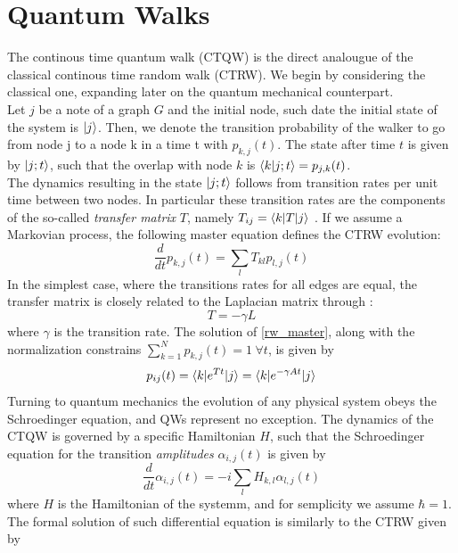 \section{Quantum Walks}
The continous time quantum walk (CTQW) is the direct analougue of the classical continous time random walk (CTRW). We begin by considering the classical one, expanding later on the quantum mechanical counterpart. \nocite{Mulken2011} \\
Let $j$ be a note of a graph $G$ and the initial node, such date the initial state of the system is ${|{j}\rangle}$. Then, we denote the transition probability of the walker to go from node j to a node k in a time t with $p_{k,j}(t)$. The state after time $t$ is given by ${|{j;t}\rangle}$, such that the overlap with node $k$ is $\braket{k|j;t}=p_{j,k}(t)$. \\
The dynamics resulting in the state ${|{j;t}\rangle}$ follows from transition rates per unit time between two nodes. In particular these transition rates are the components of the so-called \textit{transfer matrix} $T$, namely $T_{ij}= {\langle{k}|}T{|{j}\rangle}$ . If we assume a Markovian process, the following master equation defines the CTRW evolution:
\begin{equation}
  \frac{d}{dt}p_{k,j}(t) = \sum_{l}T_{kl}p_{l,j}(t)
  \label{rw_master}
\end{equation}
In the simplest case, where the transitions rates for all edges are equal, the transfer matrix is closely related to the Laplacian matrix through :
\begin{equation}
  T = -\gamma L
\end{equation}
where $\gamma$ is the transition rate. The solution of \cref{rw_master}, along with the normalization constrains $\sum_{k=1}^{N}p_{k,j}(t) = 1 \hspace{3pt} \forall t$, is given by
\begin{equation}
  p_{ij}(t)= \braket{k|e^{Tt}|j} = \braket{k|e^{-\gamma At}|j}
\end{equation}
Turning to quantum mechanics the evolution of any physical system obeys the Schroedinger equation, and QWs represent no exception. The dynamics of the CTQW is governed by a specific Hamiltonian $H$, such that the Schroedinger equation for the transition \textit{amplitudes} $\alpha_{i,j}(t)$ is given by
\begin{equation}
  \frac{d}{dt}\alpha_{i,j}(t) = -i \sum_{l}H_{k,l}\alpha_{l,j}(t)
\end{equation}
where $H$ is the Hamiltonian of the systemm, and for semplicity we assume $\hbar = 1$. The formal solution of such differential equation is similarly to the CTRW given by
